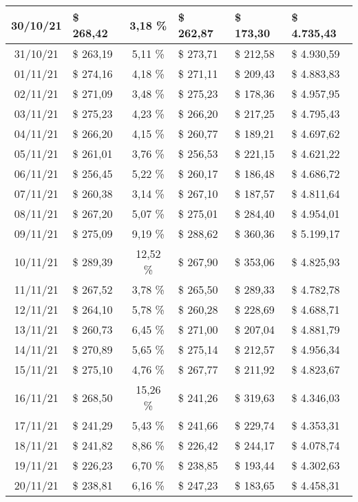 \begin{center}
\begin{small}
\begin{longtable}{|c|l|c|l|l|l|}
30/10/21 & \$ 268,42 & 3,18 \% & \$ 262,87 & \$ 173,30 & \$ 4.735,43 \\ \hline
31/10/21 & \$ 263,19 & 5,11 \% & \$ 273,71 & \$ 212,58 & \$ 4.930,59 \\ \hline
01/11/21 & \$ 274,16 & 4,18 \% & \$ 271,11 & \$ 209,43 & \$ 4.883,83 \\ \hline
02/11/21 & \$ 271,09 & 3,48 \% & \$ 275,23 & \$ 178,36 & \$ 4.957,95 \\ \hline
03/11/21 & \$ 275,23 & 4,23 \% & \$ 266,20 & \$ 217,25 & \$ 4.795,43 \\ \hline
04/11/21 & \$ 266,20 & 4,15 \% & \$ 260,77 & \$ 189,21 & \$ 4.697,62 \\ \hline
05/11/21 & \$ 261,01 & 3,76 \% & \$ 256,53 & \$ 221,15 & \$ 4.621,22 \\ \hline
06/11/21 & \$ 256,45 & 5,22 \% & \$ 260,17 & \$ 186,48 & \$ 4.686,72 \\ \hline
07/11/21 & \$ 260,38 & 3,14 \% & \$ 267,10 & \$ 187,57 & \$ 4.811,64 \\ \hline
08/11/21 & \$ 267,20 & 5,07 \% & \$ 275,01 & \$ 284,40 & \$ 4.954,01 \\ \hline
09/11/21 & \$ 275,09 & 9,19 \% & \$ 288,62 & \$ 360,36 & \$ 5.199,17 \\ \hline
10/11/21 & \$ 289,39 & 12,52 \% & \$ 267,90 & \$ 353,06 & \$ 4.825,93 \\ \hline
11/11/21 & \$ 267,52 & 3,78 \% & \$ 265,50 & \$ 289,33 & \$ 4.782,78 \\ \hline
12/11/21 & \$ 264,10 & 5,78 \% & \$ 260,28 & \$ 228,69 & \$ 4.688,71 \\ \hline
13/11/21 & \$ 260,73 & 6,45 \% & \$ 271,00 & \$ 207,04 & \$ 4.881,79 \\ \hline
14/11/21 & \$ 270,89 & 5,65 \% & \$ 275,14 & \$ 212,57 & \$ 4.956,34 \\ \hline
15/11/21 & \$ 275,10 & 4,76 \% & \$ 267,77 & \$ 211,92 & \$ 4.823,67 \\ \hline
16/11/21 & \$ 268,50 & 15,26 \% & \$ 241,26 & \$ 319,63 & \$ 4.346,03 \\ \hline
17/11/21 & \$ 241,29 & 5,43 \% & \$ 241,66 & \$ 229,74 & \$ 4.353,31 \\ \hline
18/11/21 & \$ 241,82 & 8,86 \% & \$ 226,42 & \$ 244,17 & \$ 4.078,74 \\ \hline
19/11/21 & \$ 226,23 & 6,70 \% & \$ 238,85 & \$ 193,44 & \$ 4.302,63 \\ \hline
20/11/21 & \$ 238,81 & 6,16 \% & \$ 247,23 & \$ 183,65 & \$ 4.458,31 \\ \hline

\end{longtable}
\end{small}
\end{center}
